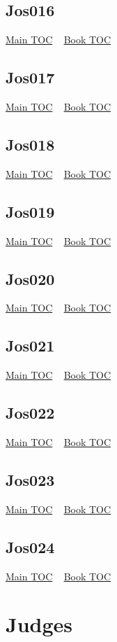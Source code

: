 \documentclass{book}
\begin{document}
  \section{Jos016}\hyperlink{toc}{Main TOC} ~ \hyperref[subsec:Jos]{Book TOC} 
  \section{Jos017}\hyperlink{toc}{Main TOC} ~ \hyperref[subsec:Jos]{Book TOC} 
  \section{Jos018}\hyperlink{toc}{Main TOC} ~ \hyperref[subsec:Jos]{Book TOC} 
  \section{Jos019}\hyperlink{toc}{Main TOC} ~ \hyperref[subsec:Jos]{Book TOC} 
  \section{Jos020}\hyperlink{toc}{Main TOC} ~ \hyperref[subsec:Jos]{Book TOC} 
  \section{Jos021}\hyperlink{toc}{Main TOC} ~ \hyperref[subsec:Jos]{Book TOC} 
  \section{Jos022}\hyperlink{toc}{Main TOC} ~ \hyperref[subsec:Jos]{Book TOC} 
  \section{Jos023}\hyperlink{toc}{Main TOC} ~ \hyperref[subsec:Jos]{Book TOC} 
  \section{Jos024}\hyperlink{toc}{Main TOC} ~ \hyperref[subsec:Jos]{Book TOC} 
  \chapter{Judges} \label{subsec:Jug} \begin{multicols}{2} \minitoc \end{multicols}
\end{document}
